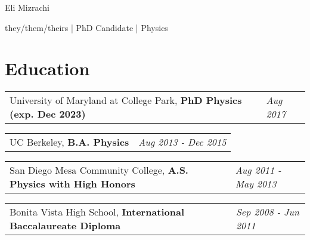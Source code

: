 \documentclass[
  10pt,
  letterpaper,
  DIV=11,
  numbers=noendperiod]{scrartcl}
\author{}
\date{}
\begin{document}
\ifdefined\Shaded\renewenvironment{Shaded}{\begin{tcolorbox}[interior hidden, boxrule=0pt, breakable, borderline west={3pt}{0pt}{shadecolor}, enhanced, sharp corners, frame hidden]}{\end{tcolorbox}}\fi

\begin{center}

\begin{LARGE}Eli Mizrachi\end{LARGE}

\begin{small}they/them/theirs | PhD Candidate | Physics\end{small}

\href{mailto:emiz@umd.edu}{}
\href{https://e-miz.github.io}{}

\end{center}

\hypertarget{fa-user-graduate-education}{%
\section{\texorpdfstring{
Education}{ Education}}\label{fa-user-graduate-education}}

\begin{tabularx}{\textwidth}{>{\RaggedRight}p{}  >{\RaggedLeft}X} University of Maryland at College Park, \textbf{PhD Physics (exp. Dec 2023)} & \textcolor{mygray}{\textit{Aug 2017}}  \end{tabularx}

\begin{tabularx}{\textwidth}{>{\RaggedRight}p{}  >{\RaggedLeft}X} UC Berkeley, \textbf{B.A. Physics} & \textcolor{mygray}{\textit{Aug 2013 - Dec 2015}}  \end{tabularx}

\begin{tabularx}{\textwidth}{>{\RaggedRight}p{}  >{\RaggedLeft}X} San Diego Mesa Community College, \textbf{A.S. Physics with High Honors} & \textcolor{mygray}{\textit{Aug 2011 - May 2013}}  \end{tabularx}

\begin{tabularx}{\textwidth}{>{\RaggedRight}p{}  >{\RaggedLeft}X} Bonita Vista High School, \textbf{International Baccalaureate Diploma} & \textcolor{mygray}{\textit{Sep 2008 - Jun 2011}}  \end{tabularx}
\end{document}
